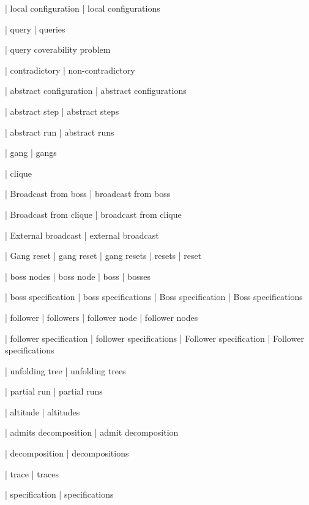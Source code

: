 | local configuration
| local configurations

| query
| queries

| query coverability problem

| contradictory
| non-contradictory

| abstract configuration
| abstract configurations

| abstract step
| abstract steps


| abstract run
| abstract runs


| gang
| gangs

| clique

| Broadcast from boss
| broadcast from boss

| Broadcast from clique
| broadcast from clique

| External broadcast
| external broadcast

| Gang reset
| gang reset
| gang resets
| resets
| reset


| boss nodes
| boss node
| boss
| bosses

| boss specification
| boss specifications
| Boss specification
| Boss specifications


| follower
| followers
| follower node
| follower nodes

| follower specification
| follower specifications
| Follower specification
| Follower specifications

| unfolding tree
| unfolding trees
%

| partial run
| partial runs

| altitude
| altitudes

| admits decomposition
| admit decomposition

| decomposition
| decompositions

| trace
| traces

| specification
| specifications

